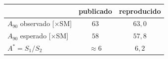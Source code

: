 \begin{tabular}{@{}lcc@{}}
\toprule
& publicado & reproducido \\
\midrule
$A_{90}$ observado [$\times$SM] & $63$ & $63{,}0$ \\
$A_{90}$ esperado [$\times$SM] & $58$ & $57{,}8$ \\
$A^{*}=S_1/S_2$ & $\approx6$ & $6{,}2$ \\
\bottomrule
\end{tabular}
